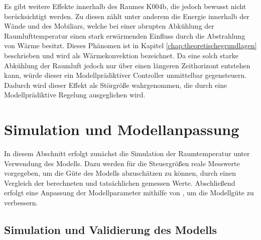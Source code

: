 Es gibt weitere Effekte innerhalb des Raumes K004b, die jedoch bewusst nicht berücksichtigt werden. Zu diesen zählt unter anderem die Energie innerhalb der Wände und des Mobiliars, welche bei einer abrupten Abkühlung der Raumlufttemperatur einen stark erwärmenden Einfluss durch die Abstrahlung von Wärme besitzt. Dieses Phänomen ist in Kapitel \ref{chap:theoretischegrundlagen} beschrieben und wird als Wärmekonvektion bezeichnet. Da eine solch starke Abkühlung der Raumluft jedoch nur über einen längeren Zeithorizont entstehen kann, würde dieser ein Modellprädiktiver Controller unmittelbar gegensteuern. Dadurch wird dieser Effekt als Störgröße wahrgenommen, die durch eine Modellprädiktive Regelung ausgeglichen wird.


\section{Simulation und Modellanpassung}

In diesem Abschnitt erfolgt zunächst die Simulation der Raumtemperatur unter Verwendung des Modells. Dazu werden für die Steuergrößen reale Messwerte vorgegeben, um die Güte des Modells abzuschätzen zu können, durch einen Vergleich der berechneten und tatsächlichen gemessen Werte. Abschließend erfolgt eine Anpassung der Modellparameter mithilfe von \cite{casiopeia}, um die Modellgüte zu verbessern.

\subsection{Simulation und Validierung des Modells}

